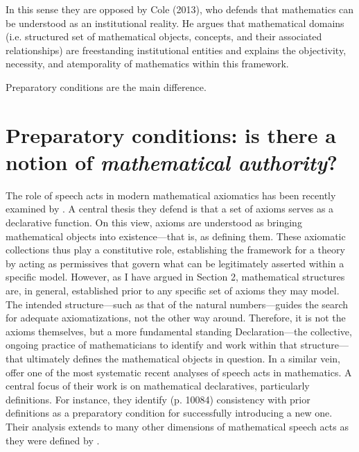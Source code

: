 \documentclass[11pt,a4paper]{article}
\begin{document}
In this sense they are opposed by Cole (2013), who defends that mathematics can be understood as an institutional reality. He argues that mathematical domains (i.e. structured set of mathematical objects, concepts, and their associated relationships) are freestanding institutional entities and explains the objectivity, necessity, and atemporality of mathematics within this framework. 

Preparatory conditions are the main difference.

\section{Preparatory conditions: is there a notion of \textit{mathematical authority}?}

The role of speech acts in modern mathematical axiomatics has been recently examined by \textcite{SchmidtVenturi2024}. A central thesis they defend is that a set of axioms serves as a declarative function. On this view, axioms are understood as bringing mathematical objects into existence—that is, as defining them. These axiomatic collections thus play a constitutive role, establishing the framework for a theory by acting as permissives that govern what can be legitimately asserted within a specific model. However, as I have argued in Section 2, mathematical structures are, in general, established prior to any specific set of axioms they may model. The intended structure—such as that of the natural numbers—guides the search for adequate axiomatizations, not the other way around. Therefore, it is not the axioms themselves, but a more fundamental standing Declaration—the collective, ongoing practice of mathematicians to identify and work within that structure—that ultimately defines the mathematical objects in question. In a similar vein, \textcite{RuffinoEtAl2021} offer one of the most systematic recent analyses of speech acts in mathematics. A central focus of their work is on mathematical declaratives, particularly definitions. For instance, they identify (p. 10084) consistency with prior definitions as a preparatory condition for successfully introducing a new one. Their analysis extends to many other dimensions of mathematical speech acts as they were defined by \textcite{SearleVanderveken1985}. 
\end{document}
